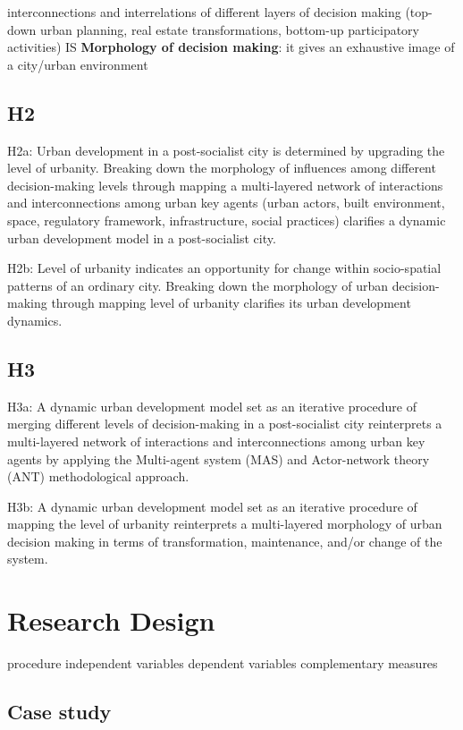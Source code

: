 \documentclass[11pt]{report}
\begin{document}
interconnections and interrelations  of  different  layers  of  decision  making (top-down urban planning, real estate transformations, bottom-up participatory activities) IS \textbf{Morphology of decision making}: it gives an exhaustive image of a city/urban environment 

\subsection{H2}

H2a:  Urban  development  in  a  post-socialist  city  is  determined  by  upgrading  the  level  of  urbanity.  Breaking  down  the 
morphology of influences among different decision-making levels through mapping a multi-layered network of interactions 
and interconnections among urban key agents (urban actors, built environment, space, regulatory framework, infrastructure, 
social practices) clarifies a dynamic urban development model in a post-socialist city.

H2b: Level of urbanity indicates an opportunity for change within socio-spatial patterns of an ordinary city.
Breaking  down  the morphology of urban
decision-making through mapping level of urbanity clarifies its urban development dynamics.

\subsection{H3}

H3a: A dynamic urban development model set as an iterative procedure of merging different levels of decision-making in a post-socialist  city  reinterprets  a  multi-layered  network  of  interactions  and  interconnections  among  urban  key  agents  by applying the Multi-agent system (MAS) and Actor-network theory (ANT) methodological approach.

H3b: A dynamic urban development model set as an iterative procedure of mapping the level of urbanity reinterprets a  multi-layered  morphology  of urban decision making
in terms of transformation, maintenance, and/or change of the system.

\section{Research Design}

procedure
independent variables
dependent variables
complementary measures

\subsection{Case study}
\end{document}
